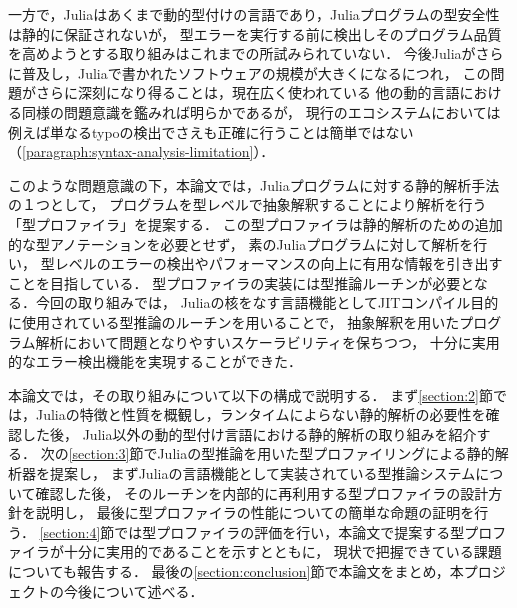 一方で，Juliaはあくまで動的型付けの言語であり，Juliaプログラムの型安全性は静的に保証されないが，
型エラーを実行する前に検出しそのプログラム品質を高めようとする取り組みはこれまでの所試みられていない．
今後Juliaがさらに普及し，Juliaで書かれたソフトウェアの規模が大きくになるにつれ，
この問題がさらに深刻になり得ることは，現在広く使われている
他の動的言語における同様の問題意識を鑑みれば明らかであるが\cite{ruby-progress-report}，
現行のエコシステムにおいては例えば単なるtypoの検出でさえも正確に行うことは簡単ではない（\ref{paragraph:syntax-analysis-limitation}）．

このような問題意識の下，本論文では，Juliaプログラムに対する静的解析手法の１つとして，
プログラムを型レベルで抽象解釈することにより解析を行う「型プロファイラ」を提案する．
この型プロファイラは静的解析のための追加的な型アノテーションを必要とせず，
素のJuliaプログラムに対して解析を行い，
型レベルのエラーの検出やパフォーマンスの向上に有用な情報を引き出すことを目指している．
型プロファイラの実装には型推論ルーチンが必要となる．今回の取り組みでは，
Juliaの核をなす言語機能としてJITコンパイル目的に使用されている型推論のルーチンを用いることで，
抽象解釈を用いたプログラム解析において問題となりやすいスケーラビリティを保ちつつ，
十分に実用的なエラー検出機能を実現することができた．

本論文では，その取り組みについて以下の構成で説明する．
まず\ref{section:2}節では，Juliaの特徴と性質を概観し，ランタイムによらない静的解析の必要性を確認した後，
Julia以外の動的型付け言語における静的解析の取り組みを紹介する．
次の\ref{section:3}節でJuliaの型推論を用いた型プロファイリングによる静的解析器を提案し，
まずJuliaの言語機能として実装されている型推論システムについて確認した後，
そのルーチンを内部的に再利用する型プロファイラの設計方針を説明し，
最後に型プロファイラの性能についての簡単な命題の証明を行う． %
\ref{section:4}節では型プロファイラの評価を行い，本論文で提案する型プロファイラが十分に実用的であることを示すとともに，
現状で把握できている課題についても報告する．
最後の\ref{section:conclusion}節で本論文をまとめ，本プロジェクトの今後について述べる．
